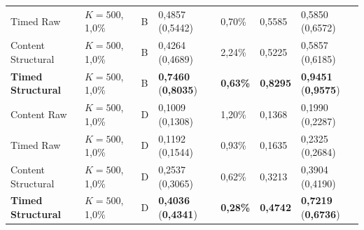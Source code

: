 \documentclass[12pt, a4paper, reqno, oneside]{book}
\begin{document}
{\begin{longtable}{P{2.8cm}P{1.7cm}P{0.7cm}P{2.1cm}P{1.5cm}P{1.4cm}P{2.1cm}}
Timed Raw & $K=500$, 1,0\% & B & 0,4857 (0,5442) & 0,70\% & 0,5585 & 0,5850 (0,6572)\\
Content Structural & $K=500$, 1,0\% & B & 0,4264 (0,4689) & 2,24\% & 0,5225 & 0,5857 (0,6185)\\
\textbf{Timed Structural} & $K=500$, 1,0\% & B & \textbf{0,7460} (\textbf{0,8035}) & \textbf{0,63\%} & \textbf{0,8295} & \textbf{0,9451} (\textbf{0,9575})\\
Content Raw & $K=500$, 1,0\% & D & 0,1009 (0,1308) & 1,20\% & 0,1368 & 0,1990 (0,2287)\\
Timed Raw & $K=500$, 1,0\% & D & 0,1192 (0,1544) & 0,93\% & 0,1635 & 0,2325 (0,2684)\\
Content Structural & $K=500$, 1,0\% & D & 0,2537 (0,3065) & 0,62\% & 0,3213 & 0,3904 (0,4190)\\
\textbf{Timed Structural} & $K=500$, 1,0\% & D & \textbf{0,4036} (\textbf{0,4341}) & \textbf{0,28\%} & \textbf{0,4742} & \textbf{0,7219} (\textbf{0,6736})\\
\bottomrule
\end{longtable}}
\end{document}
